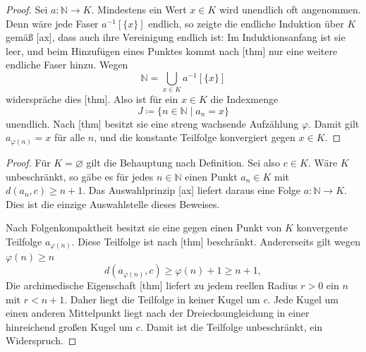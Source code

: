 \documentclass[main.tex]{subfiles}
\begin{document}
\begin{proof}
Sei \(a\colon\mathbb N\to K\). Mindestens ein Wert \(x\in K\) wird
unendlich oft angenommen. Denn wäre jede Faser \(a^{-1}[\{x\}]\) endlich,
so zeigte die endliche Induktion über \(K\) gemäß
[ax], dass auch ihre Vereinigung
endlich ist: Im Induktionsanfang ist sie leer, und beim Hinzufügen eines
Punktes kommt nach [thm] nur eine weitere endliche
Faser hinzu. Wegen
\[
 \mathbb N=\bigcup_{x\in K}a^{-1}[\{x\}]
\]
widerspräche dies
[thm]. Also ist für ein \(x\in K\) die
Indexmenge
\[
 J\coloneqq\{n\in\mathbb N\mid a_n=x\}
\]
unendlich. Nach
[thm] besitzt sie
eine streng wachsende Aufzählung \(\varphi\). Damit gilt
\(a_{\varphi(n)}=x\) für alle \(n\), und die konstante Teilfolge konvergiert
gegen \(x\in K\).
\end{proof}

\begin{proof}
Für \(K=\varnothing\) gilt die Behauptung nach Definition. Sei also
\(c\in K\). Wäre \(K\) unbeschränkt, so gäbe es für jedes
  \(n\in\mathbb N\) einen Punkt \(a_n\in K\) mit
\(d(a_n,c)\geq n+1\). Das Auswahlprinzip
[ax] liefert daraus eine Folge
\(a\colon\mathbb N\to K\). Dies ist die einzige Auswahlstelle dieses
Beweises.

Nach Folgenkompaktheit besitzt sie eine gegen einen Punkt von \(K\)
konvergente Teilfolge \(a_{\varphi(n)}\). Diese Teilfolge ist nach
[thm] beschränkt. Andererseits
gilt wegen \(\varphi(n)\geq n\)
\[
 d(a_{\varphi(n)},c)\geq\varphi(n)+1\geq n+1,
\]
Die archimedische Eigenschaft
[thm] liefert zu jedem reellen Radius
\(r>0\) ein \(n\) mit \(r<n+1\). Daher liegt die Teilfolge in keiner Kugel um
\(c\). Jede Kugel um einen anderen Mittelpunkt liegt nach der
Dreiecksungleichung in einer hinreichend großen Kugel um \(c\). Damit ist die
Teilfolge unbeschränkt, ein Widerspruch.
\end{proof}
\end{document}
